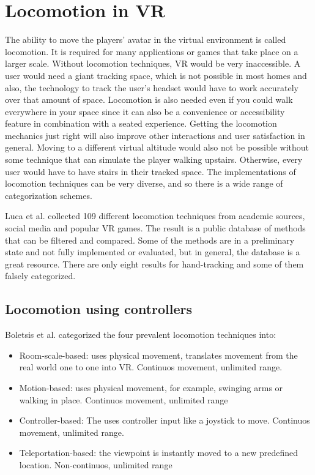 \section{Locomotion in VR}\label{locomotion-in-vr}
The ability to move the players' avatar in the virtual environment is
called locomotion. It is required for many applications or games that
take place on a larger scale. Without locomotion techniques, VR would be
very inaccessible. A user would need a giant tracking space, which is
not possible in most homes and also, the technology to track the user's
headset would have to work accurately over that amount of space. Locomotion is also
needed even if you could walk everywhere in your space since it can
also be a convenience or accessibility feature in combination with a
seated experience. Getting the locomotion mechanics just right will
also improve other interactions and user satisfaction in general. Moving
to a different virtual altitude would also not be possible without some
technique that can simulate the player walking upstairs. Otherwise,
every user would have to have stairs in their tracked space. The
implementations of locomotion techniques can be very diverse, and so there
is a wide range of categorization schemes.

Luca et al. \cite{Luca} collected 109 different locomotion techniques from academic
sources, social media and popular VR games. The result is a public
database of methods that can be filtered and compared. Some of the
methods are in a preliminary state and not fully implemented or
evaluated, but in general, the database is a great resource. There are only eight results for hand-tracking
and some of them falsely categorized.

\subsection{Locomotion using controllers}\label{locomotion-using-controllers}

Boletsis et al. \cite{Boletsis} categorized the four
prevalent locomotion techniques into:

\begin{itemize}
\itemsep1pt\parskip0pt
\item
  Room-scale-based: uses physical movement, translates movement from the
  real world one to one into VR. Continuos movement, unlimited range.\\
\item
  Motion-based: uses physical movement, for example, swinging arms or
  walking in place. Continuos movement, unlimited range\\
\item
  Controller-based: The uses controller input like a joystick to move.
  Continuos movement, unlimited range.\\
\item
  Teleportation-based: the viewpoint is instantly moved to a new
  predefined location. Non-continuos, unlimited range
\end{itemize}

